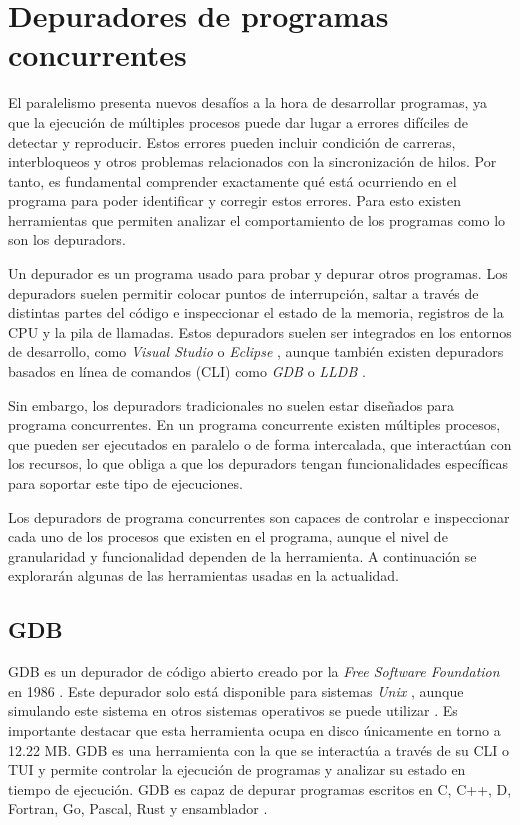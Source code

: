 \section{Depuradores de programas concurrentes}\label{sec:depuradores-programas-concurrentes}

El paralelismo presenta nuevos desafíos a la hora de desarrollar programas, ya que la ejecución de múltiples \glspl{proceso} puede dar lugar a errores difíciles de detectar y reproducir. Estos errores pueden incluir \glspl{condición de carrera}, \glspl{interbloqueo} y otros problemas relacionados con la sincronización de \glspl{hilo}. Por tanto, es fundamental comprender exactamente qué está ocurriendo en el programa para poder identificar y corregir estos errores. Para esto existen herramientas que permiten analizar el comportamiento de los programas como lo son los \glspl{depurador}. 

Un \gls{depurador} \cite{WikipediaDebugger} es un programa usado para probar y \gls{depurar} otros programas. Los \glspl{depurador} suelen permitir colocar puntos de interrupción, saltar a través de distintas partes del código e inspeccionar el estado de la memoria, registros de la \gls{CPU} y la pila de llamadas.
Estos \glspl{depurador} suelen ser integrados en los entornos de desarrollo, como \textit{Visual Studio} \cite{DebuggerVisualStudio} o \textit{Eclipse} \cite{DebuggerEclipse}, aunque también existen \glspl{depurador} basados en línea de comandos (\gls{CLI}) como \textit{GDB} \cite{GDB} o \textit{LLDB} \cite{LLDB}. 

Sin embargo, los \glspl{depurador} tradicionales no suelen estar diseñados para \glspl {programa concurrente}. En un \gls{programa concurrente} \cite{ParallelismComputerArchitecture} existen múltiples \glspl{proceso}, que pueden ser ejecutados en paralelo o de forma intercalada, que interactúan con los recursos, lo que obliga a que los \glspl{depurador} tengan funcionalidades específicas para soportar este tipo de ejecuciones.

Los \glspl{depurador} de \glspl{programa concurrente} son capaces de controlar e inspeccionar cada uno de los \glspl{proceso} que existen en el programa, aunque el nivel de granularidad y funcionalidad dependen de la herramienta. A continuación se explorarán algunas de las herramientas usadas en la actualidad.

\subsection{GDB}{\label{subsec:gdb}}
GDB es un \gls{depurador} de \gls{código abierto} creado por la \textit{Free Software Foundation} en 1986 \cite{GDB}. Este \gls{depurador} solo está disponible para sistemas \textit{Unix} \cite{UNIX}, aunque simulando este sistema en otros sistemas operativos se puede utilizar \cite{GDBDownload}. Es importante destacar que esta herramienta ocupa en disco únicamente en torno a 12.22 MB. 
GDB es una herramienta con la que se interactúa a través de su \gls{CLI} o \gls{TUI} y permite controlar la ejecución de programas y analizar su estado en tiempo de ejecución. GDB es capaz de depurar programas escritos en C, C++, D, Fortran, Go, Pascal, Rust y \gls{ensamblador} \cite{GDB}.  

